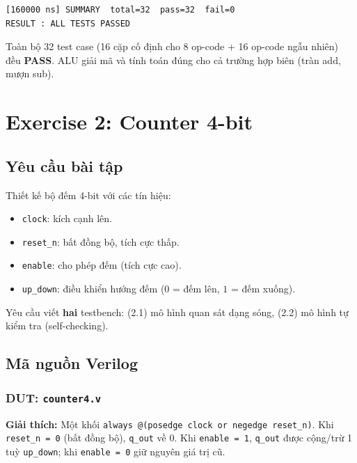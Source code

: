 \documentclass[12pt,a4paper]{article}
\begin{document}
\begin{lstlisting}[style=log, caption={Tóm tắt -- tb\_alu32.log}]
[160000 ns] SUMMARY  total=32  pass=32  fail=0
RESULT : ALL TESTS PASSED
\end{lstlisting}

Toàn bộ 32 test case (16 cặp cố định cho 8 op-code + 16 op-code ngẫu nhiên) đều \textbf{PASS}. ALU giải mã và tính toán đúng cho cả trường hợp biên (tràn add, mượn sub).

\newpage

\section{Exercise 2: Counter 4-bit}

\subsection{Yêu cầu bài tập}
Thiết kế bộ đếm 4-bit với các tín hiệu:
\begin{itemize}[leftmargin=1.5cm]
    \item \texttt{clock}: kích cạnh lên.
    \item \texttt{reset\_n}: bất đồng bộ, tích cực thấp.
    \item \texttt{enable}: cho phép đếm (tích cực cao).
    \item \texttt{up\_down}: điều khiển hướng đếm ($0$ = đếm lên, $1$ = đếm xuống).
\end{itemize}

Yêu cầu viết \textbf{hai} testbench: (2.1) mô hình quan sát dạng sóng, (2.2) mô hình tự kiểm tra (self-checking).

\subsection{Mã nguồn Verilog}

\subsubsection{DUT: \texttt{counter4.v}}


\textbf{Giải thích:} Một khối \texttt{always @(posedge clock or negedge reset\_n)}. Khi \texttt{reset\_n = 0} (bất đồng bộ), \texttt{q\_out} về 0. Khi \texttt{enable = 1}, \texttt{q\_out} được cộng/trừ 1 tuỳ \texttt{up\_down}; khi \texttt{enable = 0} giữ nguyên giá trị cũ.
\end{document}
